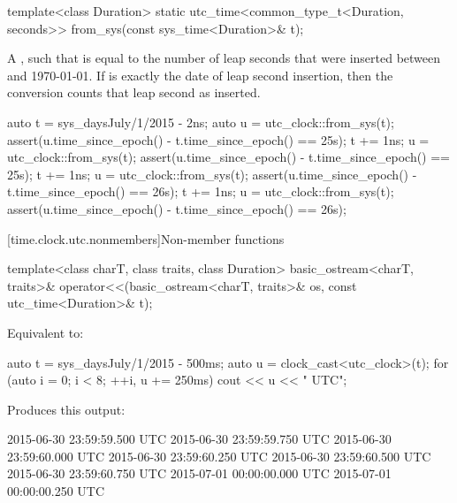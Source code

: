 %
\begin{itemdecl}
template<class Duration>
  static utc_time<common_type_t<Duration, seconds>>
    from_sys(const sys_time<Duration>& t);
\end{itemdecl}

\begin{itemdescr}
\pnum
\returns
A  , such that
is equal to the number of leap seconds that were inserted
between  and 1970-01-01.
If  is exactly the date of leap second insertion,
then the conversion counts that leap second as inserted.

\begin{example}
\begin{codeblock}
auto t = sys_days{July/1/2015} - 2ns;
auto u = utc_clock::from_sys(t);
assert(u.time_since_epoch() - t.time_since_epoch() == 25s);
t += 1ns;
u = utc_clock::from_sys(t);
assert(u.time_since_epoch() - t.time_since_epoch() == 25s);
t += 1ns;
u = utc_clock::from_sys(t);
assert(u.time_since_epoch() - t.time_since_epoch() == 26s);
t += 1ns;
u = utc_clock::from_sys(t);
assert(u.time_since_epoch() - t.time_since_epoch() == 26s);
\end{codeblock}
\end{example}
\end{itemdescr}

[time.clock.utc.nonmembers]{Non-member functions}

%
\begin{itemdecl}
template<class charT, class traits, class Duration>
  basic_ostream<charT, traits>&
    operator<<(basic_ostream<charT, traits>& os, const utc_time<Duration>& t);
\end{itemdecl}

\begin{itemdescr}
\pnum
\effects
Equivalent to:

\pnum
\begin{example}
\begin{codeblock}
auto t = sys_days{July/1/2015} - 500ms;
auto u = clock_cast<utc_clock>(t);
for (auto i = 0; i < 8; ++i, u += 250ms)
  cout << u << " UTC\n";
\end{codeblock}

Produces this output:

\begin{outputblock}
2015-06-30 23:59:59.500 UTC
2015-06-30 23:59:59.750 UTC
2015-06-30 23:59:60.000 UTC
2015-06-30 23:59:60.250 UTC
2015-06-30 23:59:60.500 UTC
2015-06-30 23:59:60.750 UTC
2015-07-01 00:00:00.000 UTC
2015-07-01 00:00:00.250 UTC
\end{outputblock}
\end{example}
\end{itemdescr}

